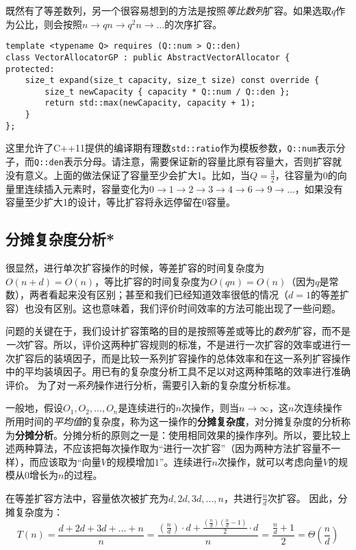 既然有了等差数列，另一个很容易想到的方法是按照\textit{等比数列}扩容。如果选取$q$作为公比，则会按照$n\to qn \to q^2n \to \dots$的次序扩容。

\begin{lstlisting}
template <typename Q> requires (Q::num > Q::den)
class VectorAllocatorGP : public AbstractVectorAllocator {
protected:
    size_t expand(size_t capacity, size_t size) const override {
        size_t newCapacity { capacity * Q::num / Q::den };
        return std::max(newCapacity, capacity + 1);
    }
};
\end{lstlisting}

这里允许了C++11提供的编译期有理数\lstinline{std::ratio}作为模板参数，\lstinline{Q::num}表示分子，而\lstinline{Q::den}表示分母。请注意，需要保证新的容量比原有容量大，否则扩容就没有意义。上面的做法保证了容量至少会扩大1。比如，当$Q=\frac{3}{2}$，往容量为0的向量里连续插入元素时，容量变化为$0\to 1\to 2\to 3\to 4\to 6\to 9\to \dots$，如果没有容量至少扩大1的设计，等比扩容将永远停留在0容量。

\subsection{分摊复杂度分析*}
\label{vec:分摊复杂度分析}
很显然，进行单次扩容操作的时候，等差扩容的时间复杂度为$O(n+d) = O(n)$，等比扩容的时间复杂度为$O(qn) = O(n)$（因为$q$是常数），两者看起来没有区别；甚至和我们已经知道效率很低的情况（$d=1$的等差扩容）也没有区别。这也意味着，我们评价时间效率的方法可能出现了一些问题。

问题的关键在于，我们设计扩容策略的目的是按照等差或等比的\textit{数列}扩容，而不是\textit{一次}扩容。所以，评价这两种扩容规则的标准，不是进行一次扩容的效率或进行一次扩容后的装填因子，而是比较一系列扩容操作的总体效率和在这一系列扩容操作中的平均装填因子。用已有的复杂度分析工具不足以对这两种策略的效率进行准确评价。
为了对\textit{一系列}操作进行分析，需要引入新的复杂度分析标准。

一般地，假设$O_1, O_2, \dots, O_n$是连续进行的$n$次操作，则当$n\to\infty$，这$n$次连续操作所用时间的\textit{平均值}的复杂度，称为这一操作的\textbf{分摊复杂度}，对分摊复杂度的分析称为\textbf{分摊分析}。分摊分析的原则之一是：使用相同效果的操作序列。所以，要比较上述两种算法，不应该把每次操作取为“进行一次扩容”（因为两种方法扩容量不一样），而应该取为“向量$V$的规模增加$1$”。连续进行$n$次操作，就可以考虑向量$V$的规模从$0$增长为$n$的过程。

在等差扩容方法中，容量依次被扩充为$d,2d,3d,\dots,n$，共进行$\frac{n}{d}$次扩容。
因此，分摊复杂度为：
$$
T(n) = \frac{d + 2d + 3d + \dots + n}n = \frac{\left(\frac{n}{d}\right)\cdot d + \frac{\left(\frac{n}{d}\right)\left(\frac{n}{d}-1\right)}2\cdot d}n = \frac{\frac{n}{d}+1}2 = \Theta\left(\frac nd\right)
$$

